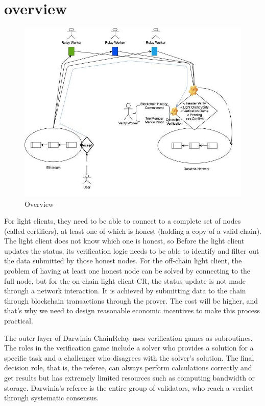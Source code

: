 \section{overview}

\begin{figure}
    \centering
    \includegraphics[scale=0.5]{pic/overview.jpg}
    \caption{Overview}
    \label{fig:my_label}
\end{figure}

For light clients, they need to be able to connect to a complete set of nodes (called certifiers), at least one of which is honest (holding a copy of a valid chain). The light client does not know which one is honest, so Before the light client updates the status, its verification logic needs to be able to identify and filter out the data submitted by those honest nodes. For the off-chain light client, the problem of having at least one honest node can be solved by connecting to the full node, but for the on-chain light client CR, the status update is not made through a network interaction. It is achieved by submitting data to the chain through blockchain transactions through the prover. The cost will be higher, and that's why we need to design reasonable economic incentives to make this process practical.

The outer layer of Darwinia ChainRelay uses verification games as subroutines. The roles in the verification game include a solver who provides a solution for a specific task and a challenger who disagrees with the solver's solution. The final decision role, that is, the referee, can always perform calculations correctly and get results but has extremely limited resources such as computing bandwidth or storage. Darwinia's referee is the entire group of validators, who reach a verdict through systematic consensus.


